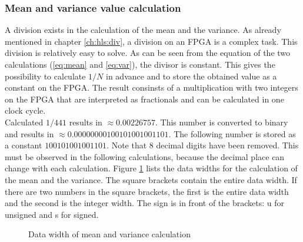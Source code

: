 \subsubsection*{Mean and variance value calculation}
A division exists in the calculation of the mean and the variance. As already mentioned in chapter \ref{ch:hls:div}, a division on an FPGA is a complex task.
This division is relatively easy to solve. As can be seen from the equation of
the two calculations (\ref{eq:mean} and \ref{eq:var}), the divisor is constant.
This gives the possibility to calculate $1/N$ in advance and to store the
obtained value as a constant on the FPGA. The result consinsts of a multiplication with
two integers on the FPGA that are interpreted as fractionals and can be
calculated in one clock cycle. \\
Calculated $1/441$ results in $\approx 0.00226757$. This number is converted to
binary and results in $\approx 0.00000000100101001001101$. The following number
is stored as a constant $100101001001101$. Note that 8 decimal digits have been
removed. This must be observed in the following calculations, because the
decimal place can change with each calculation. Figure \ref{fig:data_mean_var}
lists the data widths for the calculation of the mean and the variance. The
square brackets contain the entire data width. If there are two numbers in the
square brackets, the first is the entire data width and the second is the
integer width. The sign is in front of the brackets: u for unsigned and s for
signed.

\clearpage

\begin{figure}[tb!]
    \centering
    \begin{adjustbox}{max width=\textwidth, keepaspectratio}
        
    \end{adjustbox}
    \caption{Data width of mean and variance calculation}
    \label{fig:data_mean_var}
\end{figure}

